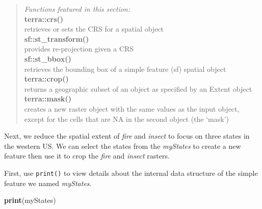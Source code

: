 \documentclass[
]{article}
\newenvironment{Shaded}{\begin{snugshade}}{\end{snugshade}}
\newcommand{\FunctionTok}[1]{\textcolor[rgb]{0.13,0.29,0.53}{\textbf{#1}}}
\newcommand{\NormalTok}[1]{#1}
\begin{document}
\begin{quote}
\emph{Functions featured in this section:}\\
\textbf{terra::crs()}\\
retrieves or sets the CRS for a spatial object\\
\textbf{sf::st\_transform()}\\
provides re-projection given a CRS\\
\textbf{sf::st\_bbox()}\\
retrieves the bounding box of a simple feature (sf) spatial object
\textbf{terra::crop()}\\
returns a geographic subset of an object as specified by an Extent
object\\
\textbf{terra::mask()}\\
creates a new raster object with the same values as the input object,
except for the cells that are NA in the second object (the `mask')
\end{quote}

Next, we reduce the spatial extent of \emph{fire} and \emph{insect} to
focus on three states in the western US. We can select the states from
the \emph{myStates} to create a new feature then use it to crop the
\emph{fire} and \emph{insect} rasters.

First, use \texttt{print()} to view details about the internal data
structure of the simple feature we named \emph{myStates}.

\begin{Shaded}
\begin{Highlighting}[]
\FunctionTok{print}\NormalTok{(myStates)}
\end{Highlighting}
\end{Shaded}
\end{document}
